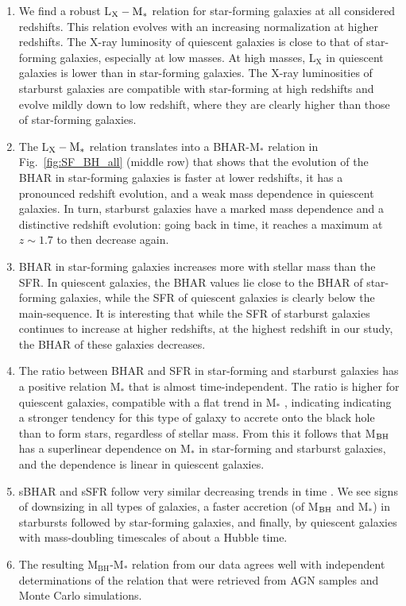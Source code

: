   \begin{enumerate}
      \item We find a robust L$_{\rm X} - {\rm M}_*$ relation for star-forming galaxies at all considered redshifts. This relation evolves with an increasing normalization at higher redshifts. The X-ray luminosity of quiescent galaxies is close to that of star-forming galaxies, especially at low masses. At high masses, L$_\text{X}$ in quiescent galaxies is lower than in star-forming galaxies. The X-ray luminosities of starburst galaxies are compatible with star-forming at high redshifts and evolve mildly down to low redshift, where they are clearly higher than those of star-forming galaxies.
      \item The L$_{\rm X} - {\rm M}_*$ relation translates into a BHAR-M$_*$ relation in Fig.~\ref{fig:SF_BH_all} (middle row) that shows that the evolution of the BHAR in star-forming galaxies is faster at lower redshifts, it has a pronounced redshift evolution, and a weak mass dependence in quiescent galaxies. In turn, starburst galaxies have a marked mass dependence and a distinctive redshift evolution: going back in time, it reaches a maximum at $z\sim 1.7$ to then decrease again.
      \item BHAR in star-forming galaxies increases more with stellar mass than the SFR. In quiescent galaxies, the BHAR values lie close to the BHAR of star-forming galaxies, while the SFR of quiescent galaxies is clearly below the main-sequence. It is interesting that while the SFR of starburst galaxies continues to increase at higher redshifts, at the highest redshift in our study, the BHAR of these galaxies decreases.
      \item The ratio between BHAR and SFR in star-forming and starburst galaxies has a positive relation M$_*$ that is almost time-independent. The ratio is higher for quiescent galaxies, compatible with a flat trend in M$_*$ , indicating indicating a stronger tendency for this type of galaxy to accrete onto the black hole than to form stars, regardless of stellar mass. From this it follows that M$_{\rm BH}$ has a superlinear dependence on M$_*$ in star-forming and starburst galaxies, and the dependence is linear in quiescent galaxies.%
      \item sBHAR and sSFR follow very similar decreasing trends in time
      . We see signs of downsizing in all types of galaxies, a faster accretion (of M$_{\rm BH}$ and M$_*$) in starbursts followed by star-forming galaxies, and finally, by quiescent galaxies with mass-doubling timescales of about a Hubble time. 
      \item The resulting M$_\text{BH}$-M$_*$ relation from our data agrees well with independent determinations of the relation that were retrieved from AGN samples and Monte Carlo simulations.
   \end{enumerate}
